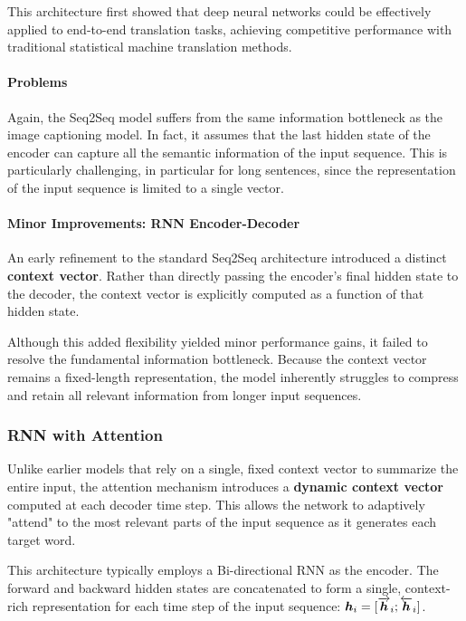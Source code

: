 This architecture first showed that deep neural networks could be effectively applied to end-to-end translation tasks,
achieving competitive performance with traditional statistical machine translation methods.

\paragraph{Problems}
Again, the Seq2Seq model suffers from the same information bottleneck as the image captioning model. In fact, it assumes that the
last hidden state of the encoder can capture all the semantic information of the input sequence.
This is particularly challenging, in particular for long sentences, since the representation of the input sequence is limited to a single vector.

\paragraph{Minor Improvements: RNN Encoder-Decoder}
An early refinement to the standard Seq2Seq architecture introduced a distinct \textbf{context vector}. Rather than directly passing the encoder's final hidden state to the decoder, the context vector is explicitly computed as a function of that hidden state.

Although this added flexibility yielded minor performance gains, it failed to resolve the fundamental information bottleneck. Because the context vector remains a fixed-length representation, the model inherently struggles to compress and retain all relevant information from longer input sequences.

\subsubsection{RNN with Attention}

Unlike earlier models that rely on a single, fixed context vector to summarize the entire input, the attention mechanism introduces a \textbf{dynamic context vector} computed at each decoder time step.
This allows the network to adaptively "attend" to the most relevant parts of the input sequence as it generates each target word.

This architecture typically employs a Bi-directional RNN as the encoder.
The forward and backward hidden states are concatenated to form a single, context-rich representation for each time step of the input sequence: $\boldsymbol{h}_i = [\overrightarrow{\boldsymbol{h}}_i; \overleftarrow{\boldsymbol{h}}_i]$.

